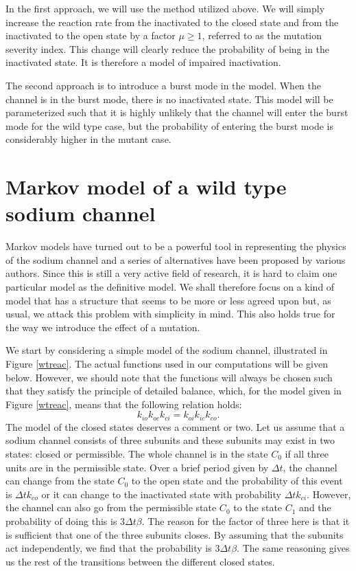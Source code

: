  In the first approach, we will use the method
utilized above. We will simply increase the reaction rate from the inactivated
to the closed state and from the inactivated to the open state by a factor
$\mu\ge1$, referred to as the mutation severity index. This change will clearly
reduce the probability of being in the inactivated state. 
It is therefore a model of impaired inactivation.

The second approach is
to introduce a burst mode in the model. When the channel is in the burst mode,
there is no inactivated state. This model will be
parameterized such that it is highly unlikely that the channel will enter the
burst mode for the wild type case, but the probability of entering the burst
mode is considerably higher in the mutant case.

\section{Markov model of a wild type sodium channel}

Markov models have turned out to be a powerful tool in representing the physics
of the sodium channel and a series of alternatives have been proposed by
various authors. Since this is still a very active field of research, it is hard
to claim one particular model as the definitive model. We
shall therefore focus on a kind of model that has a structure that seems to
be more or less agreed upon but, as usual, we attack this problem with
simplicity in mind. This also holds true for the way we introduce the effect
of a mutation.

We start by considering a simple model of the sodium channel, illustrated in
Figure \ref{wtreac}. The actual functions used in our computations will be
given below. However, we should note that the functions will always be chosen
such that they satisfy the principle of detailed balance, which, for the model
given in Figure \ref{wtreac}, means that the following relation holds:%
\begin{equation}
k_{io}k_{oc}k_{ci}=k_{oi}k_{ic}k_{co}. \label{db2}%
\end{equation}
The model of the closed states deserves a comment or two. Let us assume that a
sodium channel consists of three subunits and these subunits may exist in two
states: closed or permissible. The whole channel is in the state $C_{0}$ if
all three units are in the permissible state. Over a brief period given
by $\Delta t$, the channel can change from the state $C_{0}$ to the open
state and the probability of this event is $\Delta t k_{co}$ or it can
change to the inactivated state with probability $\Delta t k_{ci}$. However, the
channel can also go from the permissible state $C_{0}$ to the state $C_{1}$ and 
the probability of doing this is $3\Delta t \beta$. The reason for the factor 
of three here is that it is sufficient that one of the three subunits closes. By
assuming that the subunits act independently, we find that the probability is
$3\Delta t \beta$. The same reasoning gives us the rest of the
transitions between the different closed states.

